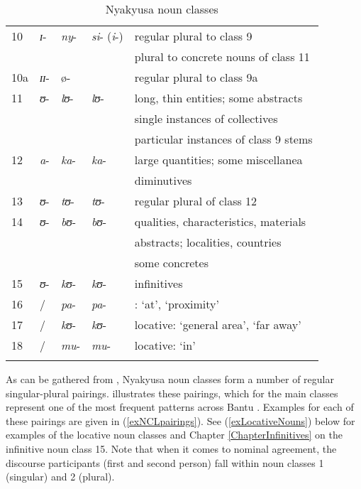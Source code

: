 \begin{table}
\begin{tabularx}{\textwidth}{lllll}
	10 & \textit{ɪ}- & \textit{ny}- & \textit{si}- (\textit{i}-) & regular plural to class 9 
	\tabularnewline & & & &plural to concrete nouns of class 11 \\ 
	
	10a & \textit{ɪɪ}- & ø- & & regular plural to class 9a \\ 
	
	11 & \textit{ʊ}- & \textit{lʊ}- & \textit{lʊ}- & long, thin entities; some abstracts \tabularnewline & & &  & single instances of collectives
	\tabularnewline &  & &  & particular instances of class 9 stems \\ 
	
	12 & \textit{a}- & \textit{ka}- & \textit{ka}- & large quantities; some miscellanea
	\tabularnewline &  & &  & diminutives \\ 
	
	13 & \textit{ʊ}- & \textit{tʊ}- & \textit{tʊ}- & regular plural of class 12 \\ 
		
	14 & \textit{ʊ}- & \textit{bʊ}- & \textit{bʊ}- & qualities, characteristics, materials
	\tabularnewline &  & &  & abstracts; localities, countries
	\tabularnewline &  & &  &  some concretes \\
	
	15 & \textit{ʊ}- & \textit{kʊ}- & \textit{kʊ}- & infinitives \\ 
	
	16 & / & \textit{pa}- & \textit{pa}- & \isi{locative}: \lq at', `proximity' \\ 
	
	17 & / & \textit{kʊ}- & \textit{kʊ}- & locative: \lq general area', `far away' \\ 
	
	18 & / & \textit{mu}- & \textit{mu}- & locative: `in' \\ 
	\lspbottomrule 
\end{tabularx}
\caption[]{Nyakyusa noun classes} \label{TableSemanticsNCL}
\end{table}

As can be gathered from , Nyakyusa noun classes form a number of regular singular-plural pairings.  illustrates these pairings, which for the main classes represent one of the most frequent patterns across Bantu \citep[109]{KatambaF2003}. Examples for each of these pairings are given in (\ref{exNCLpairings}). See (\ref{exLocativeNouns}) below for examples of the locative noun classes and Chapter \ref{ChapterInfinitives} on the infinitive noun class 15. Note that when it comes to nominal agreement, the discourse participants (first and second person) fall within noun classes 1 (singular) and 2 (plural).

